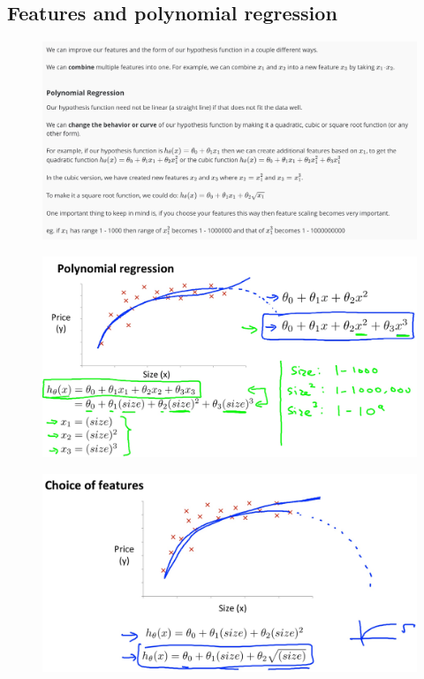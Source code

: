 \documentclass[12pt, A4,onecolumn]{article} %
\begin{document}
\subsection{Features and polynomial regression}
\begin{figure}[H]
	\centering
	\includegraphics[width=1\textwidth]{./Imagenes/poly1}
\end{figure}

\begin{figure}[H]
	\centering
	\includegraphics[width=1\textwidth]{./Imagenes/poly2}
\end{figure}

\begin{figure}[H]
	\centering
	\includegraphics[width=1\textwidth]{./Imagenes/poly3}
\end{figure}
\end{document}
